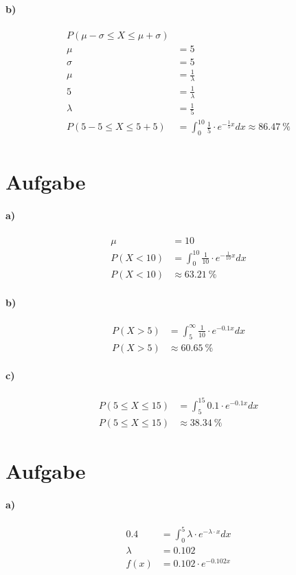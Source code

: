 \documentclass[12pt,a4paper]{report}
\begin{document}
	\paragraph{b)}
	\begin{align*}
		P(\mu - \sigma \leq X \leq \mu + \sigma) \\
		\mu &= 5\\
		\sigma &= 5 \\
		\mu &= \frac{1}{\lambda} \\
		5 &= \frac{1}{\lambda} \\
		\lambda &= \frac{1}{5} \\
		P(5 - 5 \leq X \leq 5 + 5) &= \int_0^{10} \frac{1}{5} \cdot e^{-\frac{1}{5}x} dx \approx 86.47\ \% \\
	\end{align*}
	\section{Aufgabe}
	\paragraph{a)}
	\begin{align*}
		\mu &= 10 \\
		P(X < 10)  &= \int_0^{10} \frac{1}{10} \cdot e^{-\frac{1}{10}x} dx \\
		P(X < 10) &\approx 63.21\ \%
	\end{align*}
	\paragraph{b)}
	\begin{align*}
		P(X > 5) &= \int_{5}^{\infty} \frac{1}{10} \cdot e^{-0.1x} dx \\
		P(X > 5) &\approx 60.65\ \%
	\end{align*}
	\paragraph{c)}
	\begin{align*}
		P(5\leq X \leq 15) &= \int_5^{15} 0.1\cdot e^{-0.1x} dx \\
		P(5 \leq X \leq 15) &\approx 38.34\ \%
	\end{align*}
	\section{Aufgabe}
	\paragraph{a)}
	\begin{align*}
		0.4 &= \int_{0}^{5}\lambda \cdot e^{-\lambda \cdot x} dx \\
		\lambda &= 0.102 \\
		f(x) &= 0.102 \cdot e^{-0.102x}
	\end{align*}
\end{document}
